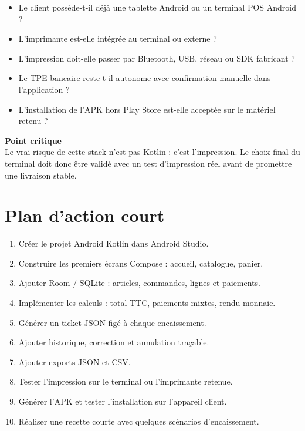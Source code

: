 \documentclass[11pt,a4paper]{article}
\begin{document}
\begin{itemize}
  \item Le client possède-t-il déjà une tablette Android ou un terminal POS Android ?
  \item L'imprimante est-elle intégrée au terminal ou externe ?
  \item L'impression doit-elle passer par Bluetooth, USB, réseau ou SDK fabricant ?
  \item Le TPE bancaire reste-t-il autonome avec confirmation manuelle dans l'application ?
  \item L'installation de l'APK hors Play Store est-elle acceptée sur le matériel retenu ?
\end{itemize}

\begin{tcolorbox}[
  colback=softblue,
  colframe=secondary,
  boxrule=0.55pt,
  arc=2pt,
  left=8pt,right=8pt,top=6pt,bottom=6pt
]
\textbf{Point critique}\\
Le vrai risque de cette stack n'est pas Kotlin : c'est l'impression. Le choix final du terminal
doit donc être validé avec un test d'impression réel avant de promettre une livraison stable.
\end{tcolorbox}

\section{Plan d'action court}

\begin{enumerate}
  \item Créer le projet Android Kotlin dans Android Studio.
  \item Construire les premiers écrans Compose : accueil, catalogue, panier.
  \item Ajouter Room / SQLite : articles, commandes, lignes et paiements.
  \item Implémenter les calculs : total TTC, paiements mixtes, rendu monnaie.
  \item Générer un ticket JSON figé à chaque encaissement.
  \item Ajouter historique, correction et annulation traçable.
  \item Ajouter exports JSON et CSV.
  \item Tester l'impression sur le terminal ou l'imprimante retenue.
  \item Générer l'APK et tester l'installation sur l'appareil client.
  \item Réaliser une recette courte avec quelques scénarios d'encaissement.
\end{enumerate}
\end{document}
